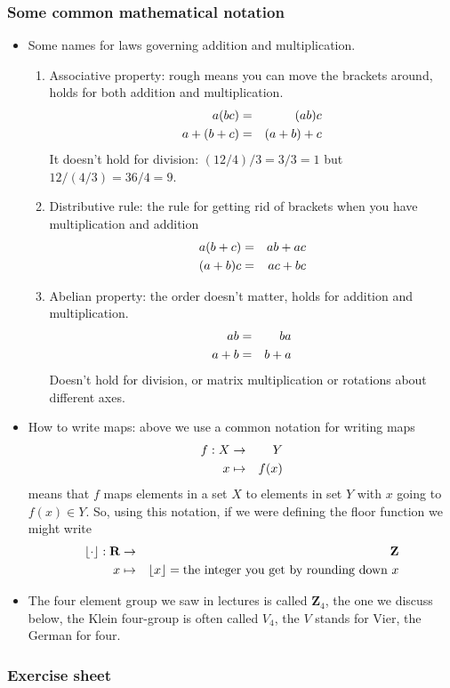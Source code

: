 \documentclass[12pt]{article}
\begin{document}
\subsubsection*{Some common mathematical notation}
\begin{itemize}
\item Some names for laws governing addition and multiplication.
\begin{enumerate}
\item Associative property: rough means you can move the brackets around, holds for both addition and multiplication. 
\begin{eqnarray}
a(bc)&=&(ab)c\cr
a+(b+c)&=&(a+b)+c
\end{eqnarray}
It doesn't hold for division: $(12/4)/3=3/3=1$ but $12/(4/3)=36/4=9$.
\item Distributive rule: the rule for getting rid of brackets when you have multiplication and addition
\begin{eqnarray}
a(b+c)&=&ab+ac\cr
(a+b)c&=&ac+bc
\end{eqnarray}
\item Abelian property: the order doesn't matter, holds for addition and multiplication.
\begin{eqnarray}
ab&=&ba\cr
a+b&=&b+a
\end{eqnarray}
Doesn't hold for division, or matrix multiplication or rotations about different axes.
\end{enumerate}
\item How to write maps: above we use a common notation for writing maps
\begin{eqnarray}
f:X&\rightarrow& Y\cr
  x&\mapsto& f(x)
\end{eqnarray}
means that $f$ maps elements in a set $X$ to elements in set $Y$ with $x$ going to $f(x)\in Y$. So, using this notation, if we were defining the floor function we might write
\begin{eqnarray}
\lfloor\cdot\rfloor: \textbf{R}&\rightarrow& \textbf{Z}\cr
x&\mapsto& \lfloor x\rfloor=\mbox{the integer you get by rounding down }x
\end{eqnarray}
\item The four element group we saw in lectures is called $\mathbf{Z}_4$, the one we discuss below, the Klein four-group is often called $V_4$, the $V$ stands for Vier, the German for four.
\end{itemize}


\subsubsection*{Exercise sheet}
\end{document}
